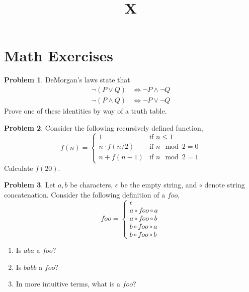 \documentclass[10pt]{article}
\title{X}
\numberwithin{pic}{section}
\numberwithin{lem}{section}
\numberwithin{thm}{section}
\numberwithin{cor}{section}
\theoremstyle{definition}
\numberwithin{ex}{section}
\numberwithin{defn}{section}
\theoremstyle{definition}
\newtheorem{prob}{Problem}
\numberwithin{prob}{section}
\theoremstyle{remark}
\theoremstyle{plain}
\numberwithin{claim}{prob}
\begin{document}
\fancyhead[r]{\today}
\pagestyle{fancy}

\section{Math Exercises}
\begin{prob}
  DeMorgan's laws state that
  \begin{align}
    \neg(P \vee Q) &\iff \neg P \wedge \neg Q\\
    \neg(P \wedge Q) &\iff \neg P \vee \neg Q
  \end{align}
  Prove one of these identities by way of a truth table.
\end{prob}
\begin{prob}
  Consider the following recursively defined function,
  $$f(n) =
  \begin{cases}
    1 &\text{if }n \leq 1\\
    n\cdot f(n / 2) &\text{if }n\mod 2 = 0\\
    n + f(n - 1) &\text{if }n\mod 2 = 1
  \end{cases} $$
  Calculate $f(20)$.
\end{prob}
\begin{prob}
  Let $a,b$ be characters, $\epsilon$ be the empty string, and $\circ$ denote string concatenation. Consider the following definition of a $foo$,
  $$foo =
  \begin{cases}
    \epsilon\\
    a\circ foo \circ a\\
    a\circ foo \circ b\\
    b\circ foo \circ a\\
    b\circ foo \circ b
  \end{cases}
  $$
  \begin{enumerate}
  \item Is $aba$ a $foo$?
  \item Is $babb$ a $foo$?
  \item In more intuitive terms, what is a $foo$?
  \end{enumerate}
\end{prob}
\end{document}
